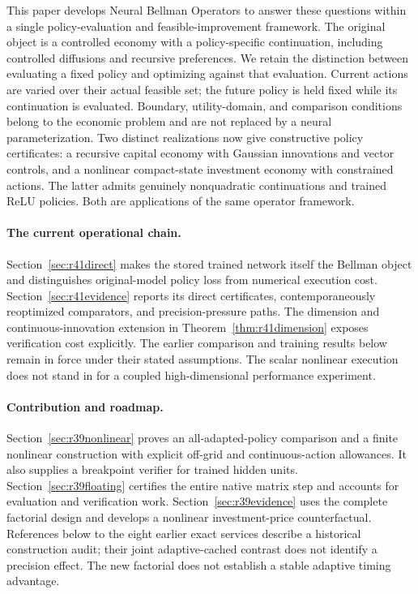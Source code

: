 \documentclass[ecta,nameyear,draft]{econsocart}
\theoremstyle{definition}
\theoremstyle{remark}
\begin{document}
This paper develops Neural Bellman Operators to answer these questions within
a single policy-evaluation and feasible-improvement framework. The original
object is a controlled economy with a policy-specific continuation, including
controlled diffusions and recursive preferences. We retain the distinction
between evaluating a fixed policy and optimizing against that evaluation.
Current actions are varied over their actual feasible set; the future policy
is held fixed while its continuation is evaluated. Boundary, utility-domain,
and comparison conditions belong to the economic problem and are not
replaced by a neural parameterization. Two distinct realizations now give constructive policy certificates: a recursive capital economy with Gaussian innovations and vector controls, and a nonlinear compact-state investment economy with constrained actions. The latter admits genuinely nonquadratic continuations and trained ReLU policies. Both are applications of the same operator framework.

\paragraph{The current operational chain.}
Section~\ref{sec:r41direct} makes the stored trained network itself the
Bellman object and distinguishes original-model policy loss from numerical
execution cost. Section~\ref{sec:r41evidence} reports its direct certificates,
contemporaneously reoptimized comparators, and precision-pressure paths.
The dimension and continuous-innovation extension in
Theorem~\ref{thm:r41dimension} exposes verification cost explicitly.
The earlier comparison and training results below remain in force under
their stated assumptions. The scalar nonlinear execution does not stand in
for a coupled high-dimensional performance experiment.

\paragraph{Contribution and roadmap.}
Section~\ref{sec:r39nonlinear} proves an all-adapted-policy comparison and a finite nonlinear construction with explicit off-grid and continuous-action allowances. It also supplies a breakpoint verifier for trained hidden units. Section~\ref{sec:r39floating} certifies the entire native matrix step and accounts for evaluation and verification work. Section~\ref{sec:r39evidence} uses the complete factorial design and develops a nonlinear investment-price counterfactual. References below to the eight earlier exact services describe a historical construction audit; their joint adaptive-cached contrast does not identify a precision effect. The new factorial does not establish a stable adaptive timing advantage.
\end{document}
